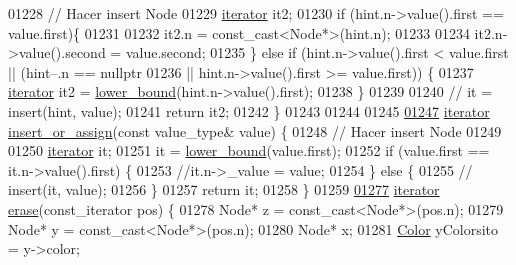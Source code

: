 \begin{DoxyCode}
01228         \textcolor{comment}{// Hacer insert Node}
01229         \hyperlink{classaed2_1_1iterator}{iterator} it2;
01230         \textcolor{keywordflow}{if} (hint.n->value().first == value.first)\{
01231 
01232             it2.n = \textcolor{keyword}{const\_cast<}Node*\textcolor{keyword}{>}(hint.n);
01233 
01234             it2.n->value().second = value.second;
01235             \} \textcolor{keywordflow}{else} \textcolor{keywordflow}{if} (hint.n->value().first < value.first || (hint--.n == \textcolor{keyword}{
      nullptr}
01236             || hint.n->value().first >= value.first)) \{
01237             \hyperlink{classaed2_1_1iterator}{iterator} it2 = \hyperlink{classaed2_1_1map_a3399d36fdd5a880b494f3a5795d3f18f_a3399d36fdd5a880b494f3a5795d3f18f}{lower_bound}(hint.n->value().first);
01238         \}
01239 
01240        \textcolor{comment}{// it = insert(hint, value);}
01241         \textcolor{keywordflow}{return} it2;
01242     \}
01243  
01244     
01245 
\hypertarget{map3_8h_source_l01247}{}\hyperlink{classaed2_1_1map_a9128a806713bcc999ebd8a97ab77e765_a9128a806713bcc999ebd8a97ab77e765}{01247}     \hyperlink{classaed2_1_1iterator}{iterator} \hyperlink{classaed2_1_1map_a9128a806713bcc999ebd8a97ab77e765_a9128a806713bcc999ebd8a97ab77e765}{insert_or_assign}(\textcolor{keyword}{const} value\_type& value) \{
01248                 \textcolor{comment}{// Hacer insert Node}
01249 
01250           \hyperlink{classaed2_1_1iterator}{iterator} it;
01251         it = \hyperlink{classaed2_1_1map_a3399d36fdd5a880b494f3a5795d3f18f_a3399d36fdd5a880b494f3a5795d3f18f}{lower_bound}(value.first);
01252         \textcolor{keywordflow}{if} (value.first == it.n->value().first) \{
01253             \textcolor{comment}{//it.n->\_value = value;}
01254         \} \textcolor{keywordflow}{else} \{
01255            \textcolor{comment}{// insert(it, value);}
01256         \}
01257         \textcolor{keywordflow}{return} it;
01258     \}
01259 
\hypertarget{map3_8h_source_l01277}{}\hyperlink{classaed2_1_1map_ad8e796bf9c9c558e5ce6b61e116253fe_ad8e796bf9c9c558e5ce6b61e116253fe}{01277}     \hyperlink{classaed2_1_1iterator}{iterator} \hyperlink{classaed2_1_1map_ad8e796bf9c9c558e5ce6b61e116253fe_ad8e796bf9c9c558e5ce6b61e116253fe}{erase}(const\_iterator pos) \{
01278         Node* z = \textcolor{keyword}{const\_cast<}Node*\textcolor{keyword}{>}(pos.n);
01279         Node* y = \textcolor{keyword}{const\_cast<}Node*\textcolor{keyword}{>}(pos.n);
01280         Node* x;
01281         \hyperlink{classaed2_1_1map_a6d62a415a4b9d320b30cada4ebcf9f5b_a6d62a415a4b9d320b30cada4ebcf9f5b}{Color} yColorsito = y->color;

\end{DoxyCode}
